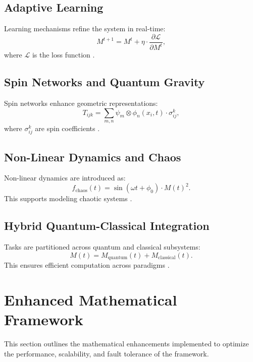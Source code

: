 \documentclass{article}
\theoremstyle{plain}
\begin{document}
\subsection{Adaptive Learning}
Learning mechanisms refine the system in real-time:
\begin{equation}
M^{t+1} = M^t + \eta \cdot \frac{\partial \mathcal{L}}{\partial M^t},
\end{equation}
where \( \mathcal{L} \) is the loss function \cite{learning2023}.

\subsection{Spin Networks and Quantum Gravity}
Spin networks enhance geometric representations:
\begin{equation}
T_{ijk} = \sum_{m,n} \psi_m \otimes \phi_n(x_i, t) \cdot \sigma_{ij}^k,
\end{equation}
where \( \sigma_{ij}^k \) are spin coefficients \cite{spinnetworks2022}.

\subsection{Non-Linear Dynamics and Chaos}
Non-linear dynamics are introduced as:
\begin{equation}
f_{\text{chaos}}(t) = \sin\left(\omega t + \phi_0\right) \cdot M(t)^2.
\end{equation}
This supports modeling chaotic systems \cite{chaos2020}.

\subsection*{Hybrid Quantum-Classical Integration}
Tasks are partitioned across quantum and classical subsystems:
\begin{equation}
M(t) = M_{\text{quantum}}(t) + M_{\text{classical}}(t).
\end{equation}
This ensures efficient computation across paradigms \cite{quantumclassical2021}.

\section{Enhanced Mathematical Framework}

This section outlines the mathematical enhancements implemented to optimize the performance, scalability, and fault tolerance of the framework.
\end{document}

